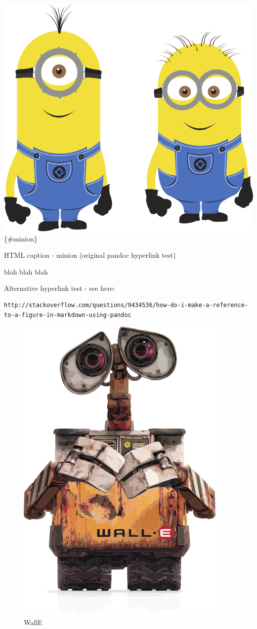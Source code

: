     \includegraphics{figures/minion.png}\{\#minion\}

HTML caption - minion (original pandoc hyperlink test)

    blah blah blah

    Alternative hyperlink test - see here:

\begin{verbatim}
http://stackoverflow.com/questions/9434536/how-do-i-make-a-reference-to-a-figure-in-markdown-using-pandoc
\end{verbatim}

    \begin{figure}[htbp]
\centering
\includegraphics{figures/WallE.png}
\caption{WallE\label{fig:WallE}}
\end{figure}

